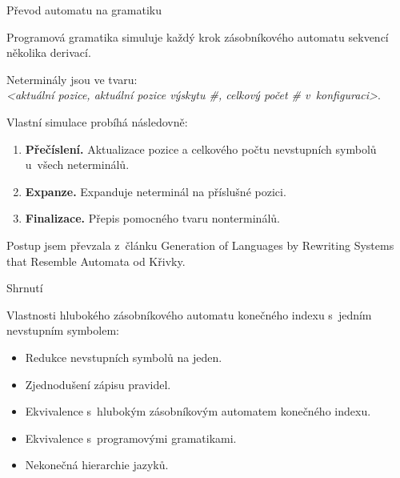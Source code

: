 \documentclass[a4paper,fyma3]{prosper}
\theoremstyle{definition}
\begin{document}
\begin{slide}{Převod automatu na gramatiku}

\bigskip

Programová gramatika simuluje každý krok zásobníkového automatu sekvencí několika derivací. \medskip

Neterminály jsou ve tvaru: \\
\emph{\gray <aktuální pozice, aktuální pozice výskytu \#, celkový počet \# v~konfiguraci>}. \medskip

Vlastní simulace probíhá následovně:

\begin{enumerate}
\item \textbf{Přečíslení.} Aktualizace pozice a celkového počtu nevstupních symbolů u~všech neterminálů.
\item \textbf{Expanze.} Expanduje neterminál na příslušné pozici.
\item \textbf{Finalizace.} Přepis pomocného tvaru nonterminálů.
\end{enumerate}

Postup jsem převzala z~článku Generation of Languages by Rewriting Systems that Resemble Automata od Křivky.

\end{slide}

\begin{slide}{Shrnutí}

\bigskip
Vlastnosti hlubokého zásobníkového automatu konečného indexu s~jedním nevstupním symbolem:

\begin{itemize}
\item Redukce nevstupních symbolů na jeden.
\item Zjednodušení zápisu pravidel.
\item Ekvivalence s~hlubokým zásobníkovým automatem konečného indexu.
\item Ekvivalence s~programovými gramatikami.
\item Nekonečná hierarchie jazyků.
\end{itemize}

\end{slide}

\end{document}
